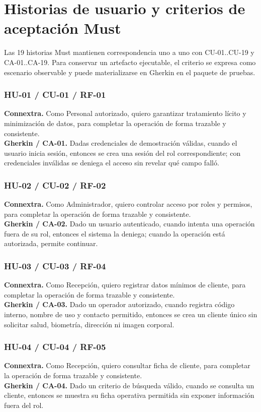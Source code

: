 \documentclass[11pt,a4paper,twoside]{article}
\begin{document}
\section{Historias de usuario y criterios de aceptación Must}
Las 19 historias Must mantienen correspondencia uno a uno con CU-01..CU-19 y CA-01..CA-19. Para conservar un artefacto ejecutable, el criterio se expresa como escenario observable y puede materializarse en Gherkin en el paquete de pruebas.
\subsubsection{HU-01 / CU-01 / RF-01}
\textbf{Connextra.} Como Personal autorizado, quiero garantizar tratamiento lícito y minimización de datos, para completar la operación de forma trazable y consistente.\\
\textbf{Gherkin / CA-01.} Dadas credenciales de demostración válidas, cuando el usuario inicia sesión, entonces se crea una sesión del rol correspondiente; con credenciales inválidas se deniega el acceso sin revelar qué campo falló.
\subsubsection{HU-02 / CU-02 / RF-02}
\textbf{Connextra.} Como Administrador, quiero controlar acceso por roles y permisos, para completar la operación de forma trazable y consistente.\\
\textbf{Gherkin / CA-02.} Dado un usuario autenticado, cuando intenta una operación fuera de su rol, entonces el sistema la deniega; cuando la operación está autorizada, permite continuar.
\subsubsection{HU-03 / CU-03 / RF-04}
\textbf{Connextra.} Como Recepción, quiero registrar datos mínimos de cliente, para completar la operación de forma trazable y consistente.\\
\textbf{Gherkin / CA-03.} Dado un operador autorizado, cuando registra código interno, nombre de uso y contacto permitido, entonces se crea un cliente único sin solicitar salud, biometría, dirección ni imagen corporal.
\subsubsection{HU-04 / CU-04 / RF-05}
\textbf{Connextra.} Como Recepción, quiero consultar ficha de cliente, para completar la operación de forma trazable y consistente.\\
\textbf{Gherkin / CA-04.} Dado un criterio de búsqueda válido, cuando se consulta un cliente, entonces se muestra su ficha operativa permitida sin exponer información fuera del rol.
\end{document}
